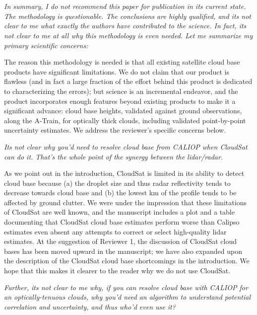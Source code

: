 \documentclass[12pt,a4paper]{responses}
\begin{document}
\section{}

\textit{In summary, I do not recommend this paper for publication in its current state.  The
methodology is questionable. The conclusions are highly qualified, and its not clear to
me what exactly the authors have contributed to the science. In fact, its not clear to me
at all why this methodology is even needed.  Let me summarize my primary scientific
concerns:}

The reason this methodology is needed is that all existing satellite cloud base
products have significant limitations.  We do not claim that our product is
flawless (and in fact a large fraction of the effort behind this product is
dedicated to characterizing the errors); but science is an incremental endeavor,
and the product incorporates enough features beyond existing products to make it
a significant advance: cloud base heights, validated against ground
observations, along the A-Train, for optically thick clouds, including validated
point-by-point uncertainty estimates.  We address the reviewer's specific
concerns below.

\textit{Its not clear why you’d need to resolve cloud base from CALIOP when CloudSat can
do it. That’s the whole point of the synergy between the lidar/radar.} 


As we point out in the introduction, CloudSat is limited in its ability to
detect cloud base because (a) the droplet size and thus radar reflectivity tends
to decrease towards cloud base and (b) the lowest km of the profile tends to be
affected by ground clutter.  We were under the impression that these limitations
of CloudSat are well known, and the manuscript includes a plot and a table
documenting that CloudSat cloud base estimates perform worse than Calipso
estimates even absent any attempts to correct or select high-quality lidar
estimates.  At the suggestion of Reviewer 1, the discussion of CloudSat cloud
bases has been moved upward in the manuscript; we have also expanded upon the
description of the CloudSat cloud base shortcomings in the introduction.  We
hope that this makes it clearer to the reader why we do not use CloudSat.

\textit{Further, its not clear to me why, if you can resolve cloud base with
  CALIOP for an optically-tenuous clouds, why you’d need an algorithm to
  understand potential correlation and uncertainty, and thus who’d even use it?}
\end{document}

